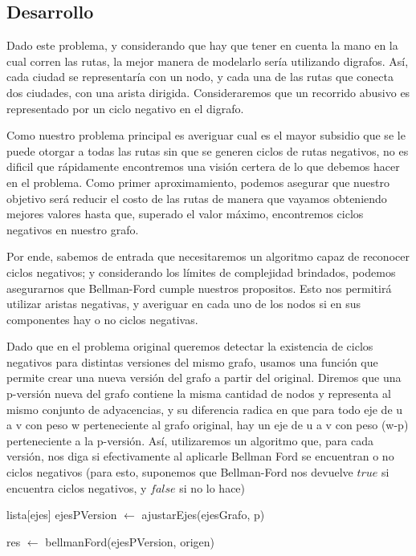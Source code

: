 \subsection{Desarrollo}
Dado este problema, y considerando que hay que tener en cuenta la mano en la cual corren las rutas, la mejor manera de modelarlo sería utilizando digrafos. Así, cada ciudad se representaría con un nodo, y cada una de las rutas que conecta dos ciudades, con una arista dirigida. Consideraremos que un recorrido abusivo es representado por un ciclo negativo en el digrafo.

Como nuestro problema principal es averiguar cual es el mayor subsidio que se le puede otorgar a todas las rutas sin que se generen ciclos de rutas negativos, no es dificil que rápidamente encontremos una visión certera de lo que debemos hacer en el problema. Como primer aproximamiento, podemos asegurar que nuestro objetivo será reducir el costo de las rutas de manera que vayamos obteniendo mejores valores hasta que, superado el valor máximo, encontremos ciclos negativos en nuestro grafo.

Por ende, sabemos de entrada que necesitaremos un algoritmo capaz de reconocer ciclos negativos; y considerando los límites de complejidad brindados, podemos asegurarnos que Bellman-Ford cumple nuestros propositos. Esto nos permitirá utilizar aristas negativas, y averiguar en cada uno de los nodos si en sus componentes hay o no ciclos negativas.

Dado que en el problema original queremos detectar la existencia de ciclos negativos para distintas versiones del mismo grafo, usamos una función que permite crear una nueva versión del grafo a partir del original. Diremos que una p-versión nueva del grafo contiene la misma cantidad de nodos y representa al mismo conjunto de adyacencias, y su diferencia radica en que para todo eje de u a v con peso w perteneciente al grafo original, hay un eje de u a v con peso (w-p) perteneciente a la p-versión. Así, utilizaremos un algoritmo que, para cada versión, nos diga si efectivamente al aplicarle Bellman Ford se encuentran o no ciclos negativos (para esto, suponemos que Bellman-Ford nos devuelve $true$ si encuentra ciclos negativos, y $false$ si no lo hace)

\begin{algorithm}[H]
	\NoCaptionOfAlgo
	\caption{}
	
	lista[ejes] ejesPVersion $\leftarrow$ ajustarEjes(ejesGrafo, p)

	res $\leftarrow$ bellmanFord(ejesPVersion, origen)
\end{algorithm}

